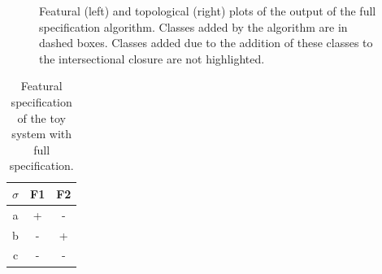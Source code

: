 \documentclass[12pt, oneside]{article}   	%
\begin{document}
\begin{figure}[htb!]
	\centering
	\qquad
	\caption{Featural (left) and topological (right) plots of the output of the full specification algorithm. Classes added by the algorithm are in dashed boxes. Classes added due to the addition of these classes to the intersectional closure are not highlighted.}
	\label{fig:toy_system_full_features}
\end{figure}

%

\begin{table}[h]
	\centering
	\begin{tabular} {|c||c|c|}
		\hline
		$\sigma$ & F1 & F2 \\ \hline
		a & + & - \\
		b & - & + \\
		c & - & - \\
		\hline
	\end{tabular}
	\caption{Featural specification of the toy system with full specification.}
	\label{table:toy_system_full}
\end{table}
\end{document}
